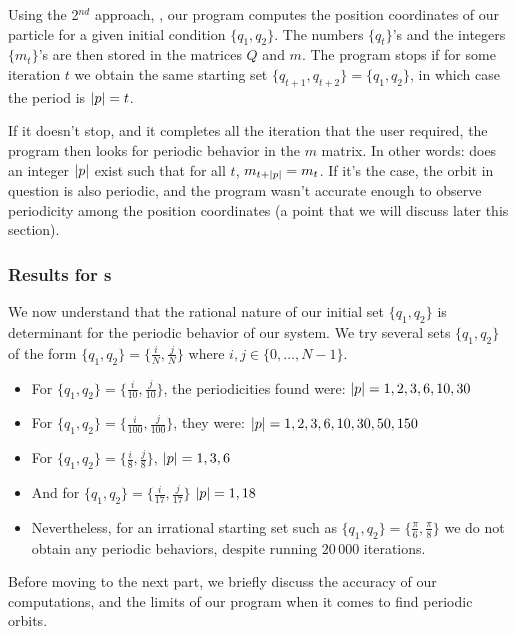 Using the 2$^{nd}$ approach, , our program
computes the position coordinates of our particle for a given initial
condition $\{q_1, q_2\}$. The numbers $\{q_t\}$'s and the integers
$\{m_t\}$'s are then stored in the matrices $Q$ and $m$. The program
stops if for some iteration $t$ we obtain the same starting set
$\{q_{t+1}, q_{t+2}\} = \{q_1, q_2\}$, in which case the period is
${{|p|}} = t$.

If it doesn't stop, and it completes all the iteration that the user
required, the program then looks for periodic behavior in the $m$ matrix.
In other words: does an integer ${{|p|}}$ exist such that for all $t$,
$m_{t + {{|p|}}} = m_t$. If it's the case, the orbit in question is
also periodic, and the program wasn't accurate enough to observe
periodicity among the position coordinates (a point that we will discuss
later this section).

\subsubsection{Results for \po s}

We now understand that the rational nature of our initial set $\{q_1, q_2\}$ is determinant for the periodic behavior of our system. We try several sets $\{q_1, q_2\}$ of the form $\{q_1, q_2\} = \{\frac{i}{N}, \frac{j}{N} \}$ where $i, j \in \{0, \dots, N-1\}$.

\begin {itemize}
\item
For $\{q_1, q_2\} = \{\frac{i}{10},\frac{j}{10}\}$, the periodicities found were: ${{|p|}} = 1, 2, 3, 6, 10, 30$
\item
For $\{q_1, q_2\} = \{\frac{i}{100},\frac{j}{100}\}$, they were: ${{|p|}} = 1, 2, 3, 6, 10, 30, 50, 150$
\item
For $\{q_1, q_2\} = \{\frac{i}{8},\frac{j}{8}\}$, ${{|p|}} = 1, 3, 6$
\item
And for $\{q_1, q_2\} = \{\frac{i}{17},\frac{j}{17}\}$ ${{|p|}} = 1, 18$
\item
Nevertheless, for an irrational starting set such as  $\{q_1, q_2\} = \{\frac{\pi}{6},\frac{\pi}{8}\}$ we do not obtain any periodic behaviors, despite running $20\,000$ iterations.
\end {itemize}

Before moving to the next part, we briefly discuss the accuracy of our computations, and the limits of our program when it comes to find periodic orbits.

